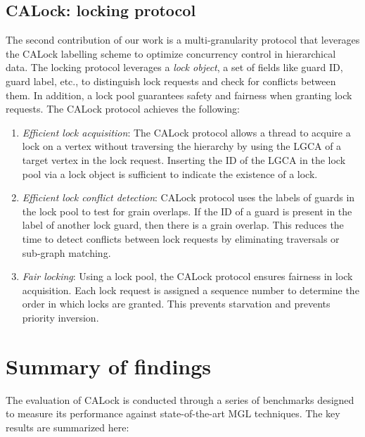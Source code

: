 \subsection{CALock: locking protocol}

The second contribution of our work is a multi-granularity protocol that leverages the CALock labelling scheme to optimize concurrency control in hierarchical data. The locking protocol leverages a \emph{lock object}, a set of fields like guard ID, guard label, etc., to distinguish lock requests and check for conflicts between them. In addition, a lock pool guarantees safety and fairness when granting lock requests. The CALock protocol achieves the following:
\begin{enumerate}
    \item \emph{Efficient lock acquisition}: The CALock protocol allows a thread to acquire a lock on a vertex without traversing the hierarchy by using the LGCA of a target vertex in the lock request. Inserting the ID of the LGCA in the lock pool via a lock object is sufficient to indicate the existence of a lock.
    \item \emph{Efficient lock conflict detection}: CALock protocol uses the labels of guards in the lock pool to test for grain overlaps. If the ID of a guard is present in the label of another lock guard, then there is a grain overlap. This reduces the time to detect conflicts between lock requests by eliminating traversals or sub-graph matching. 
    \item \emph{Fair locking}: Using a lock pool, the CALock protocol ensures fairness in lock acquisition. Each lock request is assigned a sequence number to determine the order in which locks are granted. This prevents starvation and prevents priority inversion.
\end{enumerate}




\section{Summary of findings}
The evaluation of CALock is conducted through a series of benchmarks designed to measure its performance against state-of-the-art MGL techniques. The key results are summarized here:

